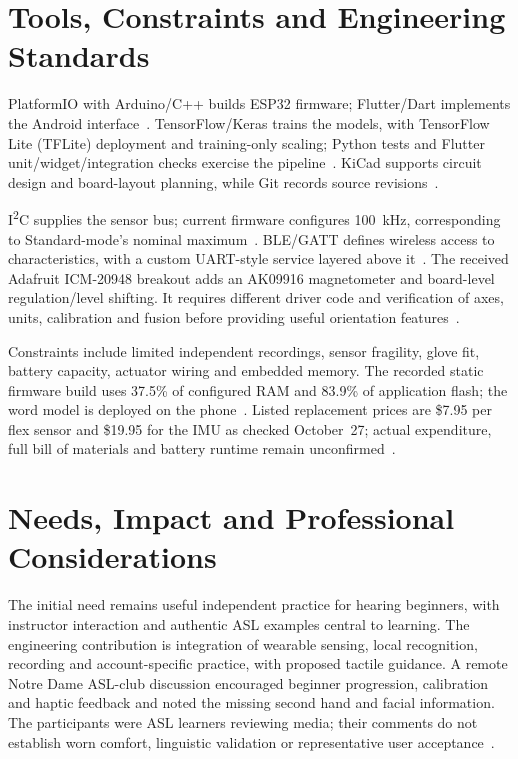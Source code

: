 \documentclass[11pt,letterpaper]{article}
\begin{document}
\section{Tools, Constraints and Engineering Standards}
PlatformIO with Arduino/C++ builds ESP32 firmware; Flutter/Dart implements the
Android interface~\cite{platformio,flutter}. TensorFlow/Keras trains the models,
with TensorFlow Lite (TFLite) deployment and training-only scaling; Python tests and Flutter
unit/widget/integration checks exercise the pipeline~\cite{keras,litert,scaler,pytest,fluttertests}.
KiCad supports circuit design and board-layout planning, while Git records
source revisions~\cite{kicad,git}.

I\textsuperscript{2}C supplies the sensor bus; current firmware configures
100~kHz, corresponding to Standard-mode's nominal maximum~\cite{i2c}.
BLE/GATT defines wireless access to characteristics, with a custom UART-style
service layered above it~\cite{ble,nus}. The received Adafruit ICM-20948 breakout
adds an AK09916 magnetometer and board-level regulation/level shifting. It
requires different driver code and verification of axes, units, calibration
and fusion before providing useful orientation features~\cite{imu}.

Constraints include limited independent recordings, sensor fragility, glove
fit, battery capacity, actuator wiring and embedded memory. The recorded static
firmware build uses 37.5\% of configured RAM and 83.9\% of application flash;
the word model is deployed on the phone~\cite{staticrecord}. Listed replacement
prices are \$7.95 per flex sensor and \$19.95 for the IMU as checked October~27;
actual expenditure, full bill of materials and battery runtime remain
unconfirmed~\cite{flex,imu}.

\section{Needs, Impact and Professional Considerations}
The initial need remains useful independent practice for hearing beginners,
with instructor interaction and authentic ASL examples central to learning.
The engineering contribution is integration of wearable sensing, local
recognition, recording and account-specific practice, with proposed tactile
guidance. A remote Notre Dame ASL-club discussion encouraged beginner progression,
calibration and haptic feedback and noted the missing second hand and facial
information. The participants were ASL learners reviewing media; their comments
do not establish worn comfort, linguistic validation or representative user
acceptance~\cite{sme}.
\end{document}
